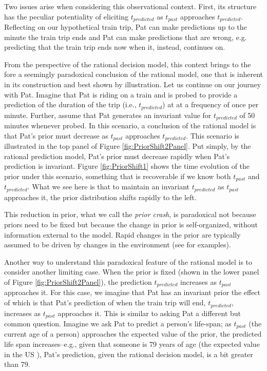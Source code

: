 \documentclass[a4paper,man,natbib]{apa6}
\begin{document}
Two issues arise when considering this observational context.  First, its structure has the peculiar potentiality of eliciting $t_{predicted}$ as $t_{past}$ approaches $t_{predicted}$.  Reflecting on our hypothetical train trip, Pat can make predictions up to the minute the train trip ends and Pat can make predictions that are wrong, e.g. predicting that the train trip ends now when it, instead, continues on. 

From the perspective of the rational decision model, this context brings to the fore a seemingly paradoxical conclusion of the rational model, one that is inherent in its construction and best shown by illustration.  Let us continue on our journey with Pat.  Imagine that Pat is riding on a train and is probed to provide a prediction of the duration of the trip (i.e., $t_{predicted}$) at at a frequency of once per minute.  Further, assume that Pat generates an invariant value for $t_{predicted}$ of 50 minutes whenever probed.  In this scenario, a conclusion of the rational model is that Pat's prior must decrease as $t_{past}$ approaches $t_{predicted}$. This scenario is illustrated in the top panel of Figure \ref{fig:PriorShift2Panel}.  Put simply, by the rational prediction model, Pat's prior must decrease rapidly when Pat's prediction is invariant.  Figure \ref{fig:PriorShift1} shows the time evolution of the prior under this scenario, something that is recoverable if we know both $t_{past}$ and $t_{predicted}$. What we see here is that to maintain an invariant $t_{predicted}$ as $t_{past}$ approaches it, the prior distribution shifts rapidly to the left.   

This reduction in prior, what we call the \textit{prior crash}, is paradoxical not because priors need to be fixed but because the change in prior is self-organized, without information external to the model.  Rapid changes in the prior are typically assumed to be driven by changes in the environment (see \cite{Sohn2021,Prat2021} for examples).

Another way to understand this paradoxical feature of the rational model is to consider another limiting case. When the prior is fixed (shown in the lower panel of Figure \ref{fig:PriorShift2Panel}), the prediction $t_{predicted}$ increases as $t_{past}$ approaches it.  For this case, we imagine that Pat has an invariant prior the effect of which is that Pat's prediction of when the train trip will end, $t_{predicted}$, increases as $t_{past}$ approaches it.  This is similar to asking Pat a different but common question. Imagine we ask Pat to predict a person's life-span; as $t_{past}$ (the current age of a person) approaches the expected value of the prior, the predicted life span increases--e.g., given that someone is 79 years of age (the expected value in the US \cite{Arias2019}), Pat's prediction, given the rational decision model, is a bit greater than 79.  
\end{document}
